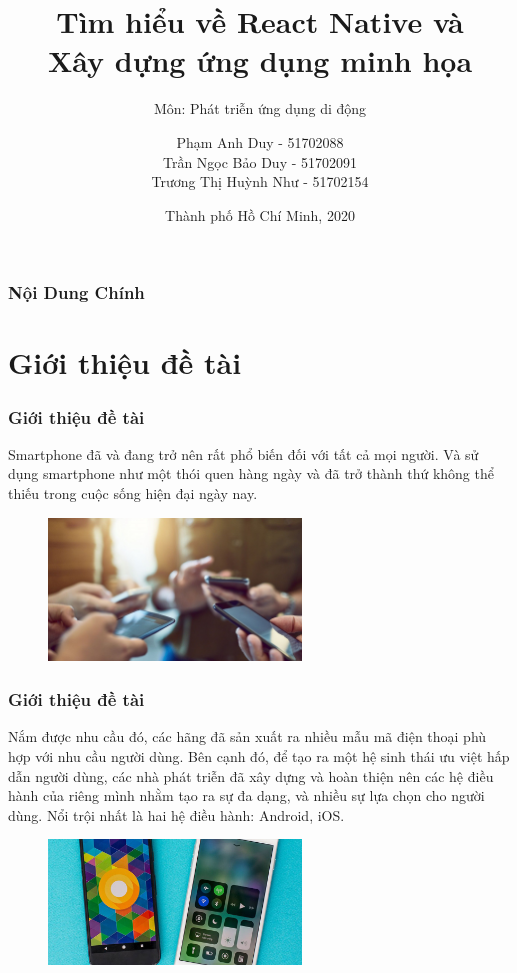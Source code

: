 \documentclass{beamer}
\title[React Native] %
{Tìm hiểu về React Native và \\ Xây dựng ứng dụng minh họa}
\subtitle{Môn: Phát triễn ứng dụng di động}
\author[A.Duy, B.Duy, H.Như] %
{Phạm Anh Duy - 51702088 \\ Trần Ngọc Bảo Duy - 51702091 \\ Trương Thị Huỳnh Như - 51702154 }
\institute[TDTU] %
{
  Khoa Công nghệ thông tin\\
  Trường Đại học Tôn Đức Thắng
}
\date[TpHCM 2020] %
{{Thành phố Hồ Chí Minh, 2020}}
\begin{document}
\frame{\titlepage}


\begin{frame}
\frametitle{Nội Dung Chính}
\tableofcontents
\end{frame}



\section{Giới thiệu đề tài}

\begin{frame}
\frametitle{Giới thiệu đề tài}

Smartphone đã và đang trở nên rất phổ biến đối với tất cả mọi người. Và sử dụng smartphone như một thói quen hàng ngày và đã trở thành thứ không thể thiếu trong cuộc sống hiện đại ngày nay.

\begin{figure}[h]
	\vspace{5pt}
	\centering
	\includegraphics[width=0.6\textwidth]{use-smartphone}
\end{figure}

\end{frame}

\begin{frame}
\frametitle{Giới thiệu đề tài}

Nắm được nhu cầu đó, các hãng đã sản xuất ra nhiều mẫu mã điện thoại phù hợp với nhu cầu người dùng. Bên cạnh đó, để tạo ra một hệ sinh thái ưu việt hấp dẫn người dùng, các nhà phát triễn đã xây dựng và hoàn thiện nên các hệ điều hành của riêng mình nhằm tạo ra sự đa dạng, và nhiều sự lựa chọn cho người dùng. Nổi trội nhất là hai hệ điều hành: Android, iOS.

\begin{figure}[h]
	\vspace{5pt}
	\centering
	\includegraphics[width=0.6\textwidth]{android-ios}
\end{figure}

\end{frame}
\end{document}

